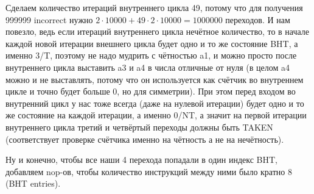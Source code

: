 \documentclass[12pt]{extarticle}
\begin{document}
Сделаем количество итераций внутреннего цикла 49, потому что для получения 999999 incorrect нужно $2\cdot10000 + 49\cdot2\cdot10000 = 1000000$ переходов. И нам повезло, ведь если итераций внутреннего цикла нечётное количество, то в начале каждой новой итерации внешнего цикла будет одно и то же состояние BHT, а именно 3/T, поэтому не надо мудрить с чётностью a1, и можно просто после внутреннего цикла выставить a3 и a4 в числа отличные от нуля (в целом a4 можно и не выставлять, потому что он используется как счётчик во внутреннем цикле и точно будет больше 0, но для симметрии). При этом перед входом во внутренний цикл у нас тоже всегда (даже на нулевой итерации) будет одно и то же состояние на каждой итерации, а именно 0/NT, а значит на первой итерации внутреннего цикла третий и четвёртый переходы должны быть TAKEN (соответствует проверке счётчика именно на чётность а не на нечётность).

Ну и конечно, чтобы все наши 4 перехода попадали в один индекс BHT, добавляем nop-ов, чтобы количество инструкций между ними было кратно 8 (BHT entries).
\end{document}
